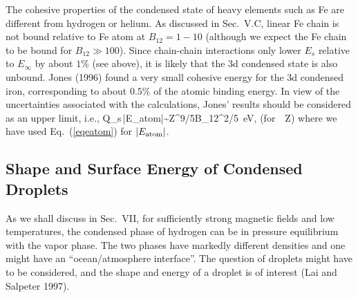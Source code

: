 The cohesive properties of the condensed state of heavy 
elements such as Fe are different from hydrogen or helium.
As discussed in Sec.~V.C, linear Fe chain is not bound relative to Fe
atom at $B_{12}=1-10$ (although we expect the Fe chain to be bound for
$B_{12}\gg 100$). Since chain-chain interactions only lower $E_s$
relative to $E_\infty$ by about $1\%$ (see above), it is 
likely that the 3d condensed state is also unbound. Jones (1996)
found a very small cohesive energy for the 3d condensed iron,
corresponding to about $0.5\%$ of the atomic binding energy. In view of 
the uncertainties associated with the calculations, Jones' results
should be considered as an upper limit, i.e.,
\be
Q_s\,|E_{\rm atom}|\sim Z^{9/5}B_{12}^{2/5}~{\rm eV},\qquad
({\rm for}~~Z) 
\label{eqqs}\ee
where we have used Eq.~(\ref{eqeatom}) for $|E_{\rm atom}|$.


\subsection{Shape and Surface Energy of Condensed Droplets}

As we shall discuss in Sec.~VII, for sufficiently strong magnetic fields
and low temperatures, the condensed phase of hydrogen can be in pressure
equilibrium with the vapor phase. The two phases have markedly different 
densities and one might have an ``ocean/atmosphere interface''. The
question of droplets might have to be considered, and the shape and energy 
of a droplet is of interest (Lai and Salpeter 1997).  


